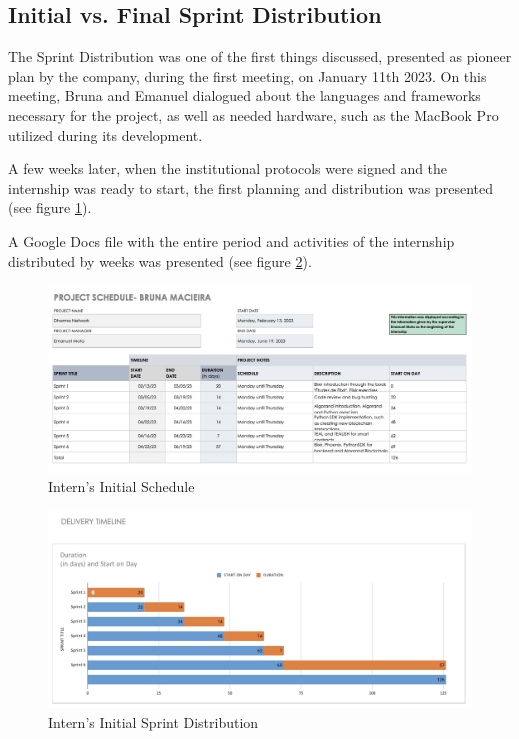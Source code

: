 \subsection{Initial vs. Final Sprint Distribution}\label{sprint}

The Sprint Distribution was one of the first things discussed, presented as pioneer plan by the company, during the first meeting, on January 11th 2023. On this meeting, Bruna and Emanuel dialogued about the languages and frameworks necessary for the project, as well as needed hardware, such as the MacBook Pro utilized during its development.\newline

A few weeks later, when the institutional protocols were signed and the internship was ready to start,  the first planning and distribution was presented (see figure \ref{sup_sch}).\newline

A Google Docs file with the entire period  and activities of the internship distributed by weeks was presented (see figure \ref{sup_days}).\newline

 \begin{figure}[htbp]
	\centering
	\includegraphics[scale=0.4]{figures/sup_sch.png}  %
	\caption{Intern's Initial Schedule}
	\label{sup_sch}
\end{figure}

 \begin{figure}[htbp]
	\centering
	\includegraphics[scale=0.4]{figures/sup_days.png}  %
	\caption{Intern's Initial Sprint Distribution}
	\label{sup_days}
\end{figure}


